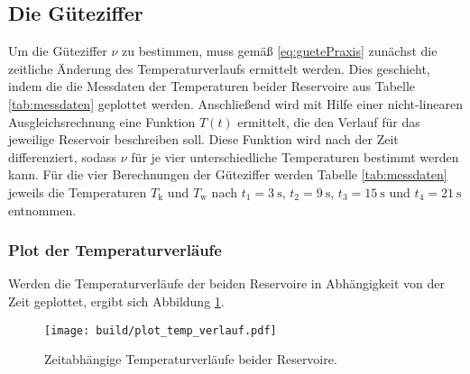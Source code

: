 \subsection{Die Güteziffer}
Um die Güteziffer $\nu$ zu bestimmen, muss gemäß \eqref{eq:guetePraxis} zunächst
die zeitliche Änderung des Temperaturverlaufs ermittelt werden.
Dies geschieht, indem die die Messdaten der Temperaturen beider Reservoire aus Tabelle \ref{tab:messdaten} geplottet werden.
Anschließend wird mit Hilfe einer nicht-linearen Ausgleichsrechnung eine Funktion $T \left(t\right)$ ermittelt, die den Verlauf 
für das jeweilige Reservoir beschreiben soll.
Diese Funktion wird nach der Zeit differenziert, sodass $\nu$ für je vier unterschiedliche Temperaturen bestimmt werden kann.
Für die vier Berechnungen der Güteziffer werden Tabelle \ref{tab:messdaten} jeweils die Temperaturen $T_{\text{k}}$ und $T_{\text{w}}$ nach 
$t_1 = \qty[]{3}{\s}$, $t_2 = \qty[]{9}{\s}$, $t_3 = \qty[]{15}{\s}$ und $t_4 = \qty[]{21}{\s}$ entnommen.


\subsubsection{Plot der Temperaturverläufe}
Werden die Temperaturverläufe der beiden Reservoire in Abhängigkeit von der Zeit geplottet, ergibt sich Abbildung \ref{fig:temperaturverlauf}.

\begin{figure}[H]
    \texttt{[image: build/plot\_temp\_verlauf.pdf]}
    \caption[]{Zeitabhängige Temperaturverläufe beider Reservoire.}
    \label{fig:temperaturverlauf}
\end{figure}


